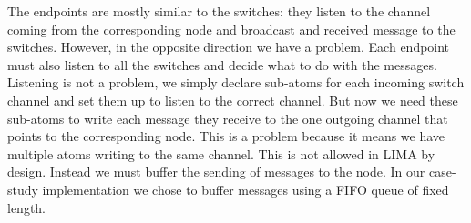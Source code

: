 The endpoints are mostly similar to the switches: they listen to the channel
coming from the corresponding node and broadcast and received message to the
switches. However, in the opposite direction we have a problem. Each endpoint
must also listen to all the switches and decide what to do with the messages.
Listening is not a problem, we simply declare sub-atoms for each incoming
switch channel and set them up to listen to the correct channel. But now we
need these sub-atoms to write each message they receive to the one outgoing
channel that points to the corresponding node. This is a problem because it
means we have multiple atoms writing to the same channel. This is not allowed
in LIMA by design. Instead we must buffer the sending of messages to the node.
In our case-study implementation we chose to buffer messages using a FIFO
queue of fixed length.
